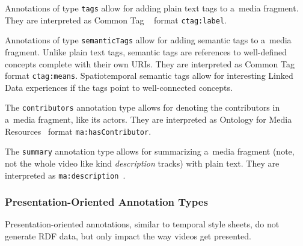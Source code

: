 \documentclass[runningheads,a4paper]{llncs}
\begin{document}
\begin{description}[leftmargin=*]
  \item[Plain Text Tags] Annotations of type
  \texttt{tags} allow for add\-ing plain text tags
  to a~media fragment.
  They are interpreted as Common Tag%
  ~\cite{commontag2009spec} format \texttt{ctag:label}.

  \item[Semantic Tags] Annotations of type
  \texttt{semanticTags} allow for adding semantic tags
  to a~media fragment.
  Unlike plain text tags, semantic tags are references to
  well-defined concepts complete with their own URIs.
  They are interpreted as Common Tag%
  ~\cite{commontag2009spec} format \texttt{ctag:means}.
  Spatiotemporal semantic tags allow for
  interesting Linked Data experiences
  if the tags point to well-connected concepts.

  \item[Contributors] The \texttt{contributors} annotation type
  allows for denoting the contributors in a~media fragment, like its actors.
  They are interpreted as
  Ontology for Media Resources~\cite{lee2012mediaontology}
  format \texttt{ma:hasContributor}.

  \item[Summary] The \texttt{summary} annotation type
  allows for summarizing a~media fragment
  (note, not the whole video like kind \emph{description} tracks)
  with plain text.
  They are interpreted as  
  \texttt{ma:description}~\cite{lee2012mediaontology}.
\end{description}

\subsubsection{Presentation-Oriented Annotation Types}

Presentation-oriented annotations,
similar to temporal style sheets,
do not generate RDF data,
but only impact the way videos get presented.\\
\end{document}
